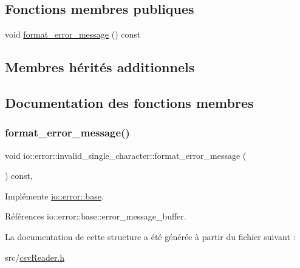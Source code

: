 \subsection*{Fonctions membres publiques}
\begin{DoxyCompactItemize}
\item 
void \hyperlink{structio_1_1error_1_1invalid__single__character_a074ab35a8013ad15041a9bb9188e69bf}{format\+\_\+error\+\_\+message} () const
\end{DoxyCompactItemize}
\subsection*{Membres hérités additionnels}


\subsection{Documentation des fonctions membres}
\mbox{\label{structio_1_1error_1_1invalid__single__character_a074ab35a8013ad15041a9bb9188e69bf}} 
\subsubsection{\texorpdfstring{format\+\_\+error\+\_\+message()}{format\_error\_message()}}
{\footnotesize\ttfamily void io\+::error\+::invalid\+\_\+single\+\_\+character\+::format\+\_\+error\+\_\+message (\begin{DoxyParamCaption}{ }\end{DoxyParamCaption}) const\hspace{0.3cm}{\ttfamily [inline]}, {\ttfamily [virtual]}}



Implémente \hyperlink{structio_1_1error_1_1base_a7d9ff6a31b716a24f056cf8a3e15191d}{io\+::error\+::base}.



Références io\+::error\+::base\+::error\+\_\+message\+\_\+buffer.



La documentation de cette structure a été générée à partir du fichier suivant \+:\begin{DoxyCompactItemize}
\item 
src/\hyperlink{csvReader_8h}{csv\+Reader.\+h}\end{DoxyCompactItemize}
